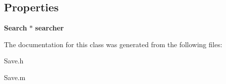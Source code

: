 \subsection*{Properties}
\begin{DoxyCompactItemize}
\item 
{\bf Search} $\ast$ {\bfseries searcher}\label{interface_save_a159c85a712155c0e101efbb99e8a5c7e}

\end{DoxyCompactItemize}


The documentation for this class was generated from the following files\+:\begin{DoxyCompactItemize}
\item 
Save.\+h\item 
Save.\+m\end{DoxyCompactItemize}
